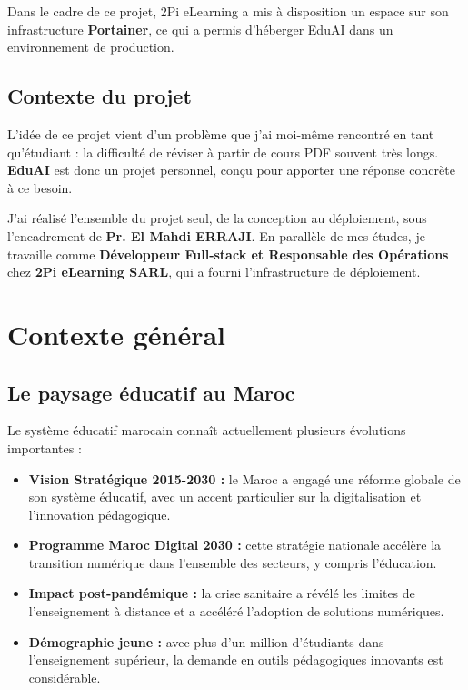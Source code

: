 Dans le cadre de ce projet, 2Pi eLearning a mis à disposition un espace sur son infrastructure \textbf{Portainer}, ce qui a permis d'héberger EduAI dans un environnement de production.

\subsection{Contexte du projet}

L'idée de ce projet vient d'un problème que j'ai moi-même rencontré en tant qu'étudiant : la difficulté de réviser à partir de cours PDF souvent très longs. \textbf{EduAI} est donc un projet personnel, conçu pour apporter une réponse concrète à ce besoin.

J'ai réalisé l'ensemble du projet seul, de la conception au déploiement, sous l'encadrement de \textbf{Pr. El Mahdi ERRAJI}. En parallèle de mes études, je travaille comme \textbf{Développeur Full-stack et Responsable des Opérations} chez \textbf{2Pi eLearning SARL}, qui a fourni l'infrastructure de déploiement.

\section{Contexte général}

\subsection{Le paysage éducatif au Maroc}

Le système éducatif marocain connaît actuellement plusieurs évolutions importantes :

\begin{itemize}
  \item \textbf{Vision Stratégique 2015-2030 :} le Maroc a engagé une réforme globale de son système éducatif, avec un accent particulier sur la digitalisation et l'innovation pédagogique.
  \item \textbf{Programme Maroc Digital 2030 :} cette stratégie nationale accélère la transition numérique dans l'ensemble des secteurs, y compris l'éducation.
  \item \textbf{Impact post-pandémique :} la crise sanitaire a révélé les limites de l'enseignement à distance et a accéléré l'adoption de solutions numériques.
  \item \textbf{Démographie jeune :} avec plus d'un million d'étudiants dans l'enseignement supérieur, la demande en outils pédagogiques innovants est considérable.
\end{itemize}

